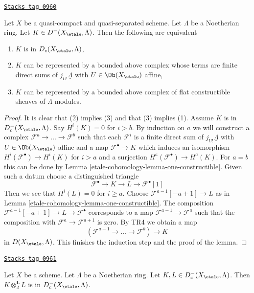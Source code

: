 \begin{lemma}
\label{etale-cohomology-lemma-bounded-above-c}
\href{https://stacks.math.columbia.edu/tag/0960}{\texttt{Stacks tag 0960}}

Let $X$ be a quasi-compact and quasi-separated scheme.
Let $\Lambda$ be a Noetherian ring. Let $K \in D^-(X_\etale, \Lambda)$. Then
the following are equivalent
\begin{enumerate}
\item $K$ is in $D_c(X_\etale, \Lambda)$,
\item $K$ can be represented by a bounded above complex
whose terms are finite direct sums of $j_{U!}\underline{\Lambda}$
with $U \in \Ob(X_\etale)$ affine,
\item $K$ can be represented by a bounded above complex
of flat constructible sheaves of $\Lambda$-modules.
\end{enumerate}
\end{lemma}

\begin{proof}
It is clear that (2) implies (3) and that (3) implies (1).
Assume $K$ is in $D_c^-(X_\etale, \Lambda)$.
Say $H^i(K) = 0$ for $i > b$. By induction on $a$
we will construct a complex $\mathcal{F}^a \to \ldots \to \mathcal{F}^b$
such that each $\mathcal{F}^i$ is a finite direct sum
of $j_{U!}\underline{\Lambda}$ with $U \in \Ob(X_\etale)$ affine
and a map $\mathcal{F}^\bullet \to K$ which induces an isomorphism
$H^i(\mathcal{F}^\bullet) \to H^i(K)$ for $i > a$ and a surjection
$H^a(\mathcal{F}^\bullet) \to H^a(K)$.
For $a = b$ this can be done by Lemma \ref{etale-cohomology-lemma-one-constructible}.
Given such a datum choose a distinguished triangle
$$
\mathcal{F}^\bullet \to K \to L \to \mathcal{F}^\bullet[1]
$$
Then we see that $H^i(L) = 0$ for $i \geq a$. Choose
$\mathcal{F}^{a - 1}[-a +1] \to L$ as in
Lemma \ref{etale-cohomology-lemma-one-constructible}. The composition
$\mathcal{F}^{a - 1}[-a +1] \to L \to \mathcal{F}^\bullet$
corresponds to a map $\mathcal{F}^{a - 1} \to \mathcal{F}^a$
such that the composition with $\mathcal{F}^a \to \mathcal{F}^{a + 1}$
is zero. By TR4 we obtain a map
$$
(\mathcal{F}^{a - 1} \to \ldots \to \mathcal{F}^b) \to K
$$
in $D(X_\etale, \Lambda)$. This finishes the induction step and the
proof of the lemma.
\end{proof}

\begin{lemma}[Tensor c]
\label{etale-cohomology-lemma-tensor-c}
\href{https://stacks.math.columbia.edu/tag/0961}{\texttt{Stacks tag 0961}}

Let $X$ be a scheme. Let $\Lambda$ be a Noetherian ring.
Let $K, L \in D_c^-(X_\etale, \Lambda)$. Then
$K \otimes_\Lambda^\mathbf{L} L$ is in $D_c^-(X_\etale, \Lambda)$.
\end{lemma}

